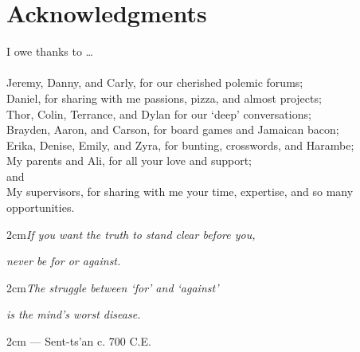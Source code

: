 \section*{Acknowledgments}
I owe thanks to \dots\\
\\Jeremy, Danny, and Carly, for our cherished polemic forums;
\\Daniel, for sharing with me passions, pizza, and almost projects;
\\Thor, Colin, Terrance, and Dylan for our `deep' conversations;
\\Brayden, Aaron, and Carson, for board games and Jamaican bacon;
\\Erika, Denise, Emily, and Zyra, for bunting, crosswords, and Harambe;
\\My parents and Ali, for all your love and support;
\\and
\\My supervisors, for sharing with me your time, expertise, and so many opportunities.
\vfill
\begin{singlespace}
\begin{addmargin}[2cm]  {2cm}\textit{If you want the truth to stand clear before you,}\end{addmargin}
\begin{addmargin}[2.5cm]{2cm}\textit{never be for or against.}                        \end{addmargin}
\begin{addmargin}[2cm]  {2cm}\textit{The struggle between `for' and `against'}        \end{addmargin}
\begin{addmargin}[2.5cm]{2cm}\textit{is the mind's worst disease.}                    \end{addmargin}
\begin{addmargin}[2cm]  {2cm}\normalfont\flushright{} --- Sent-ts'an c. 700 C.E.      \end{addmargin}
\end{singlespace}

